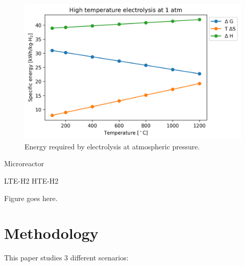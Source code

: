 \documentclass{anstrans}
\begin{document}
\begin{figure}[htbp!] %
    \centering
    \includegraphics[width=0.90\linewidth]{figures/hte-energy}
    \hfill
    \caption{Energy required by electrolysis at atmospheric pressure.}
    \label{fig:hte-energy}
\end{figure}

Microreactor

LTE-H2
HTE-H2


Figure goes here.




\section{Methodology}

This paper studies 3 different scenarios:
\end{document}
